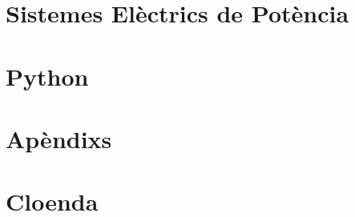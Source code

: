 \documentclass[catalan,a4paper,twoside,11pt]{book}
\begin{document}
   \part{Sistemes Elèctrics de Potència}
      \thispagestyle{empty}
      \BgThispage
      
      
      
   \part{Python}
      \thispagestyle{empty}
      \BgThispage
      
      
      
   \part{Apèndixs}
      \thispagestyle{empty}
      \BgThispage
      \appendix
      \renewcommand*{\chaptername}{\appendixname}
      
      
      
      
      
   \part{Cloenda}
      \thispagestyle{empty}
      \BgThispage
      \backmatter
      
      
      \printindex
 
\end{document}
